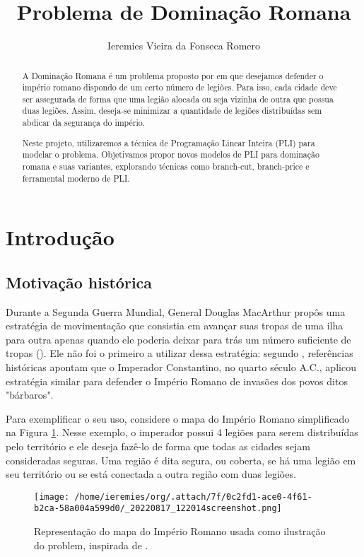\documentclass[11pt]{article}
\author{Ieremies Vieira da Fonseca Romero}
\date{}
\title{Problema de Dominação Romana}
\begin{document}
\maketitle
\begin{abstract}
A Dominação Romana é um problema proposto por \textcite{Stewart1999DefendRomanEmpire} em que desejamos defender o império romano dispondo de um certo número de legiões.
Para isso, cada cidade deve ser assegurada de forma que uma legião alocada ou seja vizinha de outra que possua duas legiões.
Assim, deseja-se minimizar a quantidade de legiões distribuídas sem abdicar da segurança do império.

Neste projeto, utilizaremos a técnica de Programação Linear Inteira (PLI) para modelar o problema.
Objetivamos propor novos modelos de PLI para dominação romana e suas variantes, explorando técnicas como branch-cut, branch-price e ferramental moderno de PLI.
\end{abstract}

\section{Introdução}
\label{sec:org3375f23}
\subsection{Motivação histórica}
\label{sec:org316761a}
Durante a Segunda Guerra Mundial, General Douglas MacArthur propôs uma estratégia de movimentação que consistia em avançar suas tropas de uma ilha para outra apenas quando ele poderia deixar para trás um número suficiente de tropas (\autocite{Stewart1999DefendRomanEmpire}).
Ele não foi o primeiro a utilizar dessa estratégia: segundo \textcite{Stewart1999DefendRomanEmpire}, referências históricas apontam que o Imperador Constantino, no quarto século A.C., aplicou estratégia similar para defender o Império Romano de invasões dos povos ditos "bárbaros".

Para exemplificar o seu uso, considere o mapa do Império Romano simplificado na Figura \ref{fig:mapa}.
Nesse exemplo, o imperador possui 4 legiões para serem distribuídas pelo território e ele deseja fazê-lo de forma que todas as cidades sejam consideradas seguras.
Uma região é dita segura, ou coberta, se há uma legião em seu território ou se está conectada a outra região com duas legiões.

\begin{figure}[htbp]
\centering
\texttt{[image: /home/ieremies/org/.attach/7f/0c2fd1-ace0-4f61-b2ca-58a004a599d0/\_20220817\_122014screenshot.png]}
\caption{\label{fig:mapa}Representação do mapa do Império Romano usada como ilustração do problem, inspirada de \textcite{Stewart1999DefendRomanEmpire}.}
\end{figure}
\end{document}
